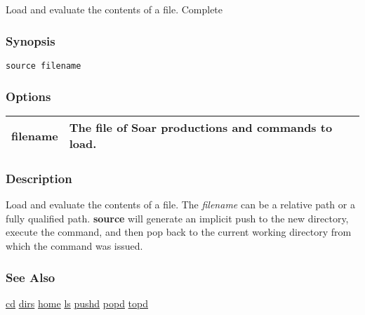 \subsection{}
\label{source}
Load and evaluate the contents of a file. 
 Complete
\subsubsection*{Synopsis}
\begin{verbatim}
source filename
\end{verbatim}
\subsubsection*{Options}
\begin{tabular}{|l|l|}
\hline 
filename & The file of Soar productions and commands to load.  \\
 \hline 
\end{tabular}
\subsubsection*{Description}
 Load and evaluate the contents of a file. The \emph{filename}
 can be a relative path or a fully qualified path. \textbf{source}
 will generate an implicit push to the new directory, execute the command, and then pop back to the current working directory from which the command was issued. 
\subsubsection*{See Also}
\hyperref[cd]{cd} \hyperref[dirs]{dirs} \hyperref[home]{home} \hyperref[ls]{ls} \hyperref[pushd]{pushd} \hyperref[popd]{popd} \hyperref[topd]{topd} 